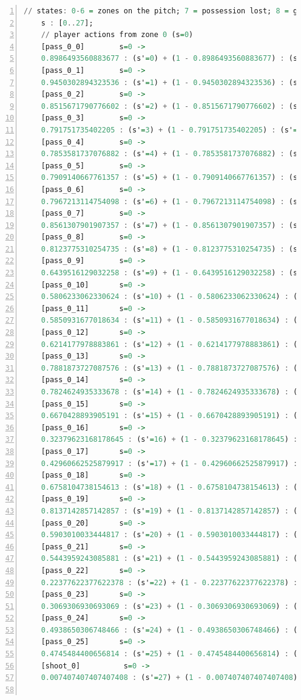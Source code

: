 \documentclass{l4proj}
\begin{document}
\begin{appendices}
\begin{lstlisting}[language=Haskell, numbers=left, caption=MDP used for strategy generation. This is the model specification as-is after the refinements at the end of chapter 3.]
	// states: 0-6 = zones on the pitch; 7 = possession lost; 8 = goal scored
	s : [0..27];
	// player actions from zone 0 (s=0)
	[pass_0_0]	      s=0 ->
	0.8986493560883677 : (s'=0) + (1 - 0.8986493560883677) : (s'=26);
	[pass_0_1]	      s=0 ->
	0.9450302894323536 : (s'=1) + (1 - 0.9450302894323536) : (s'=26);
	[pass_0_2]	      s=0 ->
	0.8515671790776602 : (s'=2) + (1 - 0.8515671790776602) : (s'=26);
	[pass_0_3]	      s=0 ->
	0.791751735402205 : (s'=3) + (1 - 0.791751735402205) : (s'=26);
	[pass_0_4]	      s=0 ->
	0.7853581737076882 : (s'=4) + (1 - 0.7853581737076882) : (s'=26);
	[pass_0_5]	      s=0 ->
	0.7909140667761357 : (s'=5) + (1 - 0.7909140667761357) : (s'=26);
	[pass_0_6]	      s=0 ->
	0.7967213114754098 : (s'=6) + (1 - 0.7967213114754098) : (s'=26);
	[pass_0_7]	      s=0 ->
	0.8561307901907357 : (s'=7) + (1 - 0.8561307901907357) : (s'=26);
	[pass_0_8]	      s=0 ->
	0.8123775310254735 : (s'=8) + (1 - 0.8123775310254735) : (s'=26);
	[pass_0_9]	      s=0 ->
	0.6439516129032258 : (s'=9) + (1 - 0.6439516129032258) : (s'=26);
	[pass_0_10]	      s=0 ->
	0.5806233062330624 : (s'=10) + (1 - 0.5806233062330624) : (s'=26);
	[pass_0_11]	      s=0 ->
	0.5850931677018634 : (s'=11) + (1 - 0.5850931677018634) : (s'=26);
	[pass_0_12]	      s=0 ->
	0.6214177978883861 : (s'=12) + (1 - 0.6214177978883861) : (s'=26);
	[pass_0_13]	      s=0 ->
	0.7881873727087576 : (s'=13) + (1 - 0.7881873727087576) : (s'=26);
	[pass_0_14]	      s=0 ->
	0.7824624935333678 : (s'=14) + (1 - 0.7824624935333678) : (s'=26);
	[pass_0_15]	      s=0 ->
	0.6670428893905191 : (s'=15) + (1 - 0.6670428893905191) : (s'=26);
	[pass_0_16]	      s=0 ->
	0.32379623168178645 : (s'=16) + (1 - 0.32379623168178645) : (s'=26);
	[pass_0_17]	      s=0 ->
	0.42960662525879917 : (s'=17) + (1 - 0.42960662525879917) : (s'=26);
	[pass_0_18]	      s=0 ->
	0.6758104738154613 : (s'=18) + (1 - 0.6758104738154613) : (s'=26);
	[pass_0_19]	      s=0 ->
	0.8137142857142857 : (s'=19) + (1 - 0.8137142857142857) : (s'=26);
	[pass_0_20]	      s=0 ->
	0.5903010033444817 : (s'=20) + (1 - 0.5903010033444817) : (s'=26);
	[pass_0_21]	      s=0 ->
	0.5443959243085881 : (s'=21) + (1 - 0.5443959243085881) : (s'=26);
	[pass_0_22]	      s=0 ->
	0.22377622377622378 : (s'=22) + (1 - 0.22377622377622378) : (s'=26);
	[pass_0_23]	      s=0 ->
	0.3069306930693069 : (s'=23) + (1 - 0.3069306930693069) : (s'=26);
	[pass_0_24]	      s=0 ->
	0.4938650306748466 : (s'=24) + (1 - 0.4938650306748466) : (s'=26);
	[pass_0_25]	      s=0 ->
	0.4745484400656814 : (s'=25) + (1 - 0.4745484400656814) : (s'=26);
	[shoot_0]	       s=0 ->
	0.007407407407407408 : (s'=27) + (1 - 0.007407407407407408) : (s'=26);


\end{lstlisting}
\end{appendices}
\end{document}
